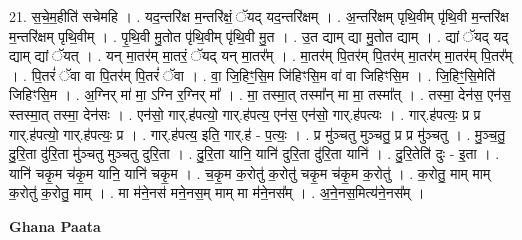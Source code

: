 \documentclass[17pt]{extarticle}
\begin{document}
21. स॒चे॒म॒हीति॑ सचेमहि । . यद॒न्तरि॑क्ष म॒न्तरि॑क्षं॒ ॅयद् यद॒न्तरि॑क्षम् । . अ॒न्तरि॑क्षम् पृथि॒वीम् पृ॑थि॒वी म॒न्तरि॑क्ष म॒न्तरि॑क्षम् पृथि॒वीम् । . पृ॒थि॒वी मु॒तोत पृ॑थि॒वीम् पृ॑थि॒वी मु॒त । . उ॒त द्याम् द्या मु॒तोत द्याम् । . द्यां ॅयद् यद् द्याम् द्यां ॅयत् । . यन् मा॒तर॑म् मा॒तरं॒ ॅयद् यन् मा॒तर᳚म् । . मा॒तर॑म् पि॒तर॑म् पि॒तर॑म् मा॒तर॑म् मा॒तर॑म् पि॒तर᳚म् । . पि॒तरं॑ ॅवा वा पि॒तर॑म् पि॒तरं॑ ॅवा । . वा॒ जि॒हिꣳ॒॒सि॒म जि॑हिꣳसि॒म वा॑ वा जिहिꣳसि॒म । . जि॒हिꣳ॒॒सि॒मेति॑ जिहिꣳसि॒म । . अ॒ग्निर् मा॑ मा॒ ऽग्नि र॒ग्निर् मा᳚ । . मा॒ तस्मा॒त् तस्मा᳚न् मा मा॒ तस्मा᳚त् । . तस्मा॒ देन॑स॒ एन॑स॒ स्तस्मा॒त् तस्मा॒ देन॑सः । . एन॑सो॒ गार्.ह॑पत्यो॒ गार्.ह॑पत्य॒ एन॑स॒ एन॑सो॒ गार्.ह॑पत्यः । . गार्.ह॑पत्यः॒ प्र प्र गार्.ह॑पत्यो॒ गार्.ह॑पत्यः॒ प्र । . गार्.ह॑पत्य॒ इति॒ गार्.ह॑ - प॒त्यः॒ । . प्र मु॑ञ्चतु मुञ्चतु॒ प्र प्र मु॑ञ्चतु । . मु॒ञ्च॒तु॒ दु॒रि॒ता दु॑रि॒ता मु॑ञ्चतु मुञ्चतु दुरि॒ता । . दु॒रि॒ता यानि॒ यानि॑ दुरि॒ता दु॑रि॒ता यानि॑ । . दु॒रि॒तेति॑ दुः - इ॒ता । . यानि॑ चकृ॒म च॑कृ॒म यानि॒ यानि॑ चकृ॒म । . च॒कृ॒म क॒रोतु॑ क॒रोतु॑ चकृ॒म च॑कृ॒म क॒रोतु॑ । . क॒रोतु॒ माम् माम् क॒रोतु॑ क॒रोतु॒ माम् । . मा म॑ने॒नस॑ मने॒नस॒म् माम् मा म॑ने॒नस᳚म् । . अ॒ने॒नस॒मित्य॑ने॒नस᳚म् । \newline

\textbf{Ghana Paata } \newline
\end{document}
